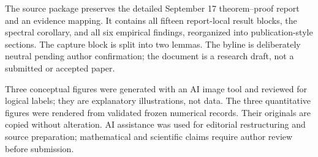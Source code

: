 The source package preserves the detailed September 17 theorem--proof
report and an evidence mapping. It contains all fifteen report-local result
blocks, the spectral corollary, and all six empirical findings, reorganized
into publication-style sections. The capture block is split into two lemmas.
The byline is deliberately neutral pending author confirmation; the
document is a research draft, not a submitted or accepted paper.

Three conceptual figures were generated with an AI image tool and reviewed
for logical labels; they are explanatory illustrations, not data. The three
quantitative figures were rendered from validated frozen numerical records.
Their originals are copied without alteration. AI assistance was used for
editorial restructuring and source preparation; mathematical and scientific
claims require author review before submission.
